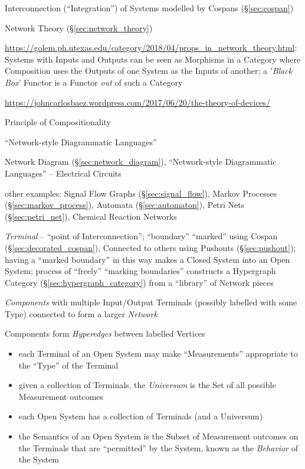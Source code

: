 Interconnection (``Integration'') of Systems modelled by Cospans
(\S\ref{sec:cospan})

\fist Network Theory (\S\ref{sec:network_theory})

\url{https://golem.ph.utexas.edu/category/2018/04/props_in_network_theory.html}:
Systems with Inputs and Outputs can be seen as Morphisms in a Category where
Composition uses the Outputs of one System as the Inputs of another; a
'\emph{Black Box}' Functor is a Functor \emph{out} of such a Category

\url{https://johncarlosbaez.wordpress.com/2017/06/20/the-theory-of-devices/}

Principle of Compositionality

``Network-style Diagrammatic Languages''

Network Diagram (\S\ref{sec:network_diagram}), ``Network-style
Diagrammatic Languages'' -- Electrical Circuits

other examples: Signal Flow Graphs (\S\ref{sec:signal_flow}),
Markov Processes (\S\ref{sec:markov_process}), Automata
(\S\ref{sec:automaton}), Petri Nets (\S\ref{sec:petri_net}), Chemical
Reaction Networks

\emph{Terminal} -- ``point of Interconnection''; ``boundary''
``marked'' using Cospan (\S\ref{sec:decorated_cospan}), Connected to
others using Pushouts (\S\ref{sec:pushout}); having a ``marked
boundary'' in this way makes a Closed System into an Open System;
process of ``freely''  ``marking boundaries'' constructs a Hypergraph
Category (\S\ref{sec:hypergraph_category}) from a ``library'' of
Network pieces

\emph{Components} with multiple Input/Output Terminals (possibly
labelled with some Type) connected to form a larger \emph{Network}

Components form \emph{Hyperedges} between labelled Vertices

\begin{itemize}
  \item each Terminal of an Open System may make ``Measurements''
    appropriate to the ``Type'' of the Terminal
  \item given a collection of Terminals, the \emph{Universum} is the
    Set of all possible Measurement outcomes
  \item each Open System has a collection of Terminals (and a Universum)
  \item the Semantics of an Open System is the Subset of Measurement
    outcomes on the Terminals that are ``permitted'' by the System,
    known as the \emph{Behavior} of the System
\end{itemize}

